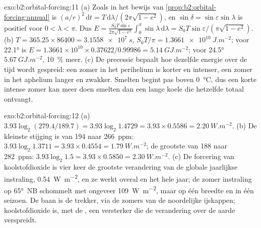 \begin{solution}{exo:b2:orbital-forcing:11}
(a) Zoals in het bewijs van \cref{prop:b2:orbital-forcing:annual} is $(a/r)^2\,\mathrm dt =
T\,\mathrm d\lambda/(2\pi\sqrt{1 - e^2})$, en $\sin\delta = \sin\varepsilon\sin\lambda$ is positief
voor $0 < \lambda < \pi$. Dus $E = \frac{S_0T\sin\varepsilon}{2\pi\sqrt{1 - e^2}}\int_0^{\pi}\sin\lambda
\,\mathrm d\lambda = S_0T\sin\varepsilon/(\pi\sqrt{1 - e^2})$. (b) $T = 365.25 \times 86400 =
\qty{3.1558e7}{s}$, $S_0T/\pi = \qty{1.3661e10}{J.m^{-2}}$; voor \ang{22.1} is $E = 1.3661 \times 10^{10}
\times 0.37622/0.99986 = \qty{5.14}{GJ.m^{-2}}$; voor \ang{24.5} $\qty{5.67}{GJ.m^{-2}}$,
\qty{10}{\percent} meer. (c) De precessie bepaalt hoe dezelfde energie over de tijd wordt gespreid: een zomer
in het perihelium is korter en intenser, een zomer in het aphelium langer en zwakker. Smelten begint
pas boven \qty{0}{\celsius}, dus een korte intense zomer kan meer doen smelten dan een lange koele die
hetzelfde totaal ontvangt.
\end{solution}

\begin{solution}{exo:b2:orbital-forcing:12}
(a) $3.93\log_2(279.4/189.7) = 3.93\log_2 1.4729 = 3.93 \times 0.5586 = \qty{2.20}{W.m^{-2}}$. (b) De
kleinste stijging is van 194 naar \qty{266}{ppm}: $3.93\log_2 1.3711 = 3.93 \times 0.4554 =
\qty{1.79}{W.m^{-2}}$; de grootste van 188 naar \qty{282}{ppm}: $3.93\log_2 1.5 = 3.93 \times 0.5850 =
\qty{2.30}{W.m^{-2}}$. (c) De forcering van koolstofdioxide is vier keer de grootste verandering van de
globale jaarlijkse instraling, \qty{0.54}{W.m^{-2}}, en ze werkt overal en het hele jaar; de zomer%
instraling op \ang{65}~NB schommelt met ongeveer \qty{109}{W.m^{-2}}, maar op één breedte en in één seizoen. De
baan is de trekker, via de zomers van de noordelijke ijskappen; koolstofdioxide is, met de
, een versterker die de verandering over de aarde verspreidt.
\end{solution}

